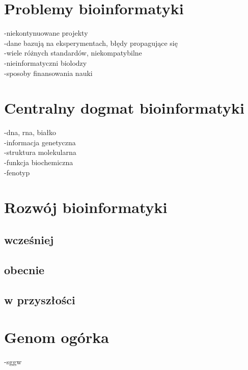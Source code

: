 \section{Problemy bioinformatyki}
-niekontynuowane projekty \\
-dane bazują na eksperymentach, błędy propagujące się \\
-wiele różnych standardów, niekompatybilne \\
-nieinformatyczni biolodzy \\
-sposoby finansowania nauki \\

\section{Centralny dogmat bioinformatyki}
-dna, rna, białko \\
-informacja genetyczna \\
-struktura molekularna \\
-funkcja biochemiczna \\
-fenotyp

\section{Rozwój bioinformatyki}
\subsection{wcześniej}
\subsection{obecnie}
\subsection{w przyszłości}

\section{Genom ogórka}
-sggw
